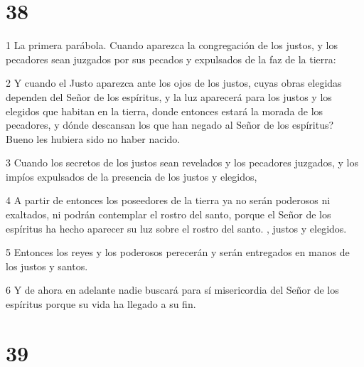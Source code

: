 \chapter{38}
\par 1 La primera parábola. Cuando aparezca la congregación de los justos, y los pecadores sean juzgados por sus pecados y expulsados ​​de la faz de la tierra:
\par 2 Y cuando el Justo aparezca ante los ojos de los justos, cuyas obras elegidas dependen del Señor de los espíritus, y la luz aparecerá para los justos y los elegidos que habitan en la tierra, donde entonces estará la morada de los pecadores, y dónde descansan los que han negado al Señor de los espíritus? Bueno les hubiera sido no haber nacido.
\par 3 Cuando los secretos de los justos sean revelados y los pecadores juzgados, y los impíos expulsados ​​de la presencia de los justos y elegidos,
\par 4 A partir de entonces los poseedores de la tierra ya no serán poderosos ni exaltados, ni podrán contemplar el rostro del santo, porque el Señor de los espíritus ha hecho aparecer su luz sobre el rostro del santo. , justos y elegidos.
\par 5 Entonces los reyes y los poderosos perecerán y serán entregados en manos de los justos y santos.
\par 6 Y de ahora en adelante nadie buscará para sí misericordia del Señor de los espíritus porque su vida ha llegado a su fin.

\chapter{39}

